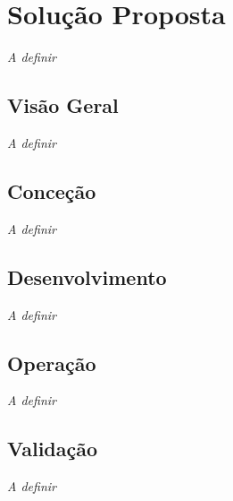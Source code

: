 \chapter{Solução Proposta}
\label{chap:Chapter4}

\textit{A definir}

\section{Visão Geral} 
\label{sec:chap4_general_vision}

\textit{A definir}

\section{Conceção} 
\label{sec:chap4_conception}

\textit{A definir}

\section{Desenvolvimento} 
\label{sec:chap4_development}

\textit{A definir}

\section{Operação} 
\label{sec:chap4_operation}

\textit{A definir}

\section{Validação} 
\label{sec:chap4_validation}

\textit{A definir}

